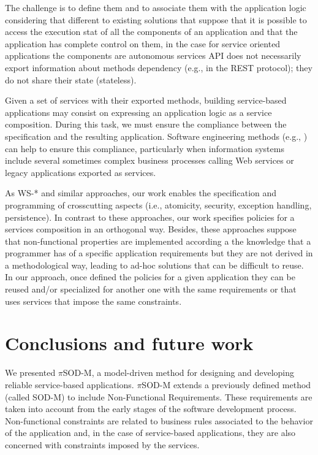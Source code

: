 \documentclass[12pt,twoside]{article}
\theoremstyle{plain}
\theoremstyle{plain}
\newcommand{\pisodm}[0]{$\pi$SOD-M\xspace}
\begin{document}
\begin{multicols}{2}
The challenge is to define them and to associate them with the application logic considering that different to existing solutions that suppose that it is possible to access the execution stat of all the components  of an application and that the application has complete control on them, in the case for service oriented applications  the components are autonomous services
API does not necessarily export information about methods dependency (e.g., in the REST protocol);
they do not share their state (stateless).

Given a set of services with their exported methods, building service-based applications may consist on expressing an application logic as a service composition.
During this task, we must ensure the compliance between the specification and the resulting application.
Software engineering methods (e.g., \cite{2,decastro1,PapazoglouH06}) can help to ensure this compliance, particularly when information systems include several sometimes complex business processes calling Web services or legacy applications exported as services.

As WS-* and similar approaches, our work enables the specification and programming of crosscutting aspects (i.e., atomicity, security, exception handling, persistence).
In contrast to these approaches, our work specifies policies for a services composition in an orthogonal way. Besides, these approaches suppose that non-functional properties are implemented according a the knowledge that a programmer has of a specific application requirements but they are not derived in a methodological way, leading to ad-hoc solutions that can be difficult to reuse. In our approach, once defined the policies for a given application they can be reused and/or specialized for another one with the same requirements or that uses services that impose the same constraints. 


\section{Conclusions and future work}\label{sec:conclusions}
We presented \pisodm, a model-driven method for designing and developing reliable service-based applications.
\pisodm extends a previously defined method (called SOD-M) to include Non-Functional Requirements.
These requirements are taken into account from the early stages of the software development process.
Non-functional constraints are related to business rules associated to the behavior of the application and, in the case of service-based applications, they are also concerned with constraints imposed by the services.


\end{multicols}
\end{document}
